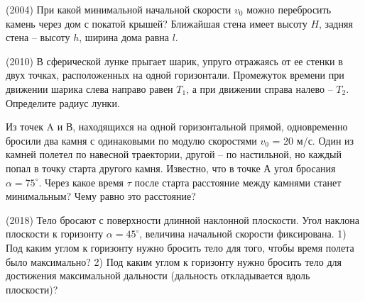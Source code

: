 \AddProb (2004) При какой минимальной начальной скорости $v_0$ можно перебросить камень через дом с покатой крышей? 
Ближайшая стена имеет высоту $H$, задняя стена -- высоту $h$, ширина дома равна $l$.

\AddProb (2010) В сферической лунке прыгает шарик, упруго отражаясь от ее стенки в двух точках, расположенных на одной горизонтали. 
Промежуток времени при движении шарика слева направо равен $T_{1}$, а при движении справа налево -- $T_2$. Определите радиус лунки.

\AddProb Из точек A и В, находящихся на одной горизонтальной прямой, одновременно бросили два камня с одинаковыми по модулю скоростями $v_0$ = 20 м/с. 
Один из камней полетел по навесной траектории, другой -- по настильной, но каждый попал в точку старта другого камня. 
Известно, что в точке А угол бросания $\alpha = 75^{\circ}$. 
Через какое время $\tau$ после старта расстояние между камнями станет минимальным? Чему равно это расстояние?

\AddProb (2018) Тело бросают с поверхности длинной наклонной плоскости. Угол наклона плоскости к горизонту $\alpha = 45^{\circ}$, величина начальной скорости фиксирована. 1) Под каким углом к горизонту нужно бросить тело для того, чтобы время полета было максимально? 2) Под каким углом к горизонту нужно бросить тело для достижения максимальной дальности (дальность откладывается вдоль плоскости)?